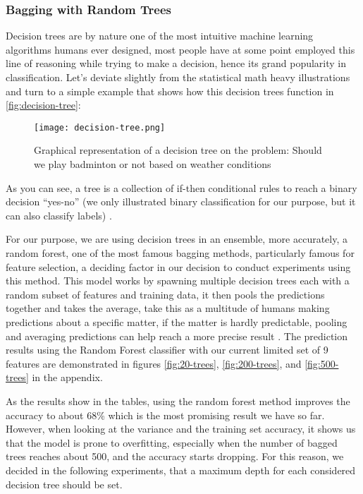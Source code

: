 \subsubsection{Bagging with Random Trees}
Decision trees are by nature one of the most intuitive machine learning algorithms humans ever designed, most people have at some point employed this line of reasoning while trying to make a decision, hence its grand popularity in classification.
Let’s deviate slightly from the statistical math heavy illustrations and turn to a simple example that shows how this decision trees function in
\autoref{fig:decision-tree}:

\begin{figure}[h]
  \centering
  \texttt{[image: decision-tree.png]}
  \caption{Graphical representation of a decision tree on the problem: Should we play badminton or not based on weather conditions}
  \label{fig:decision-tree}
\end{figure}

As you can see, a tree is a collection of if-then conditional rules to reach a binary decision “yes-no” (we only illustrated binary classification
for our purpose, but it can also classify labels) \cite{6}.

For our purpose, we are using decision trees in an ensemble, more accurately, a random forest, one of the most famous bagging methods, particularly famous for feature selection, a deciding factor in our decision to conduct experiments using this method.
This model works by spawning multiple decision trees each with a random subset of features and training data, it then pools the predictions together
and takes the average, take this as a multitude of humans making predictions about a specific matter, if the matter is hardly predictable, pooling and
averaging predictions can help reach a more precise result \cite{10}.
The prediction results using the Random Forest classifier with our current limited set of 9 features are demonstrated in figures
\autoref{fig:20-trees}, \autoref{fig:200-trees}, and \autoref{fig:500-trees} in the appendix.

As the results show in the tables, using the random forest method improves the accuracy to about 68\% which is the most promising result we have so far.
However, when looking at the variance and the training set accuracy, it shows us that the model is prone to overfitting, especially when the number of bagged trees reaches about 500, and the accuracy starts dropping.
For this reason, we decided in the following experiments, that a maximum depth for each considered decision tree should be set.


